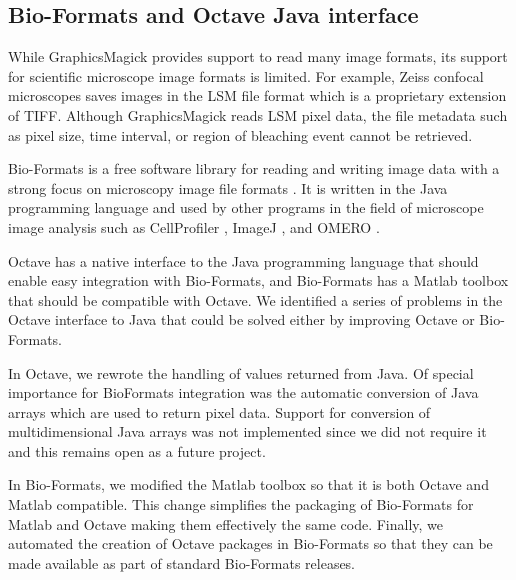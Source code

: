 \subsection{Bio-Formats and Octave Java interface}

While GraphicsMagick provides support to read many image formats, its
support for scientific microscope image formats is limited.
For example, Zeiss confocal microscopes saves
images in the LSM file format which is a proprietary extension of TIFF.
Although GraphicsMagick reads LSM pixel data,
the file metadata such as pixel size, time interval, or region of
bleaching event cannot be retrieved.

Bio-Formats is a free software library for reading and writing image
data with a strong focus on microscopy image file formats
\citep{bioformats}.  It is written in the Java programming language and
used by other programs in the field of microscope image analysis such
as CellProfiler \citep{cellprofiler}, ImageJ \citep{imagej2}, and OMERO
\citep{omero}.

Octave has a native interface to the Java programming language
that should enable easy integration with
Bio-Formats, and Bio-Formats has a Matlab toolbox that should be
compatible with Octave.
We identified a series of problems in the Octave interface to Java that
could be solved either by improving Octave or Bio-Formats.

In Octave, we rewrote the handling of values returned from Java.
Of special importance for BioFormats integration was the automatic conversion of
Java arrays which are used to return pixel data.
Support for conversion of multidimensional Java arrays was not implemented
since we did not require it and this remains open as a future project.

In Bio-Formats, we modified the Matlab toolbox so that it is
both Octave and Matlab compatible.
This change simplifies the packaging of
Bio-Formats for Matlab and Octave making them
effectively the same code.
Finally, we automated the creation of Octave packages in Bio-Formats
so that they can be made available as part of standard Bio-Formats releases.

